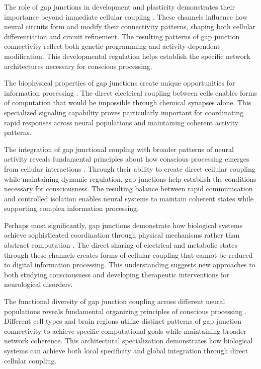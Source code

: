 \begin{refsection}
The role of gap junctions in development and plasticity demonstrates their importance beyond immediate cellular coupling \cite{Nadarajah1996}. These channels influence how neural circuits form and modify their connectivity patterns, shaping both cellular differentiation and circuit refinement. The resulting patterns of gap junction connectivity reflect both genetic programming and activity-dependent modification. This developmental regulation helps establish the specific network architectures necessary for conscious processing.

The biophysical properties of gap junctions create unique opportunities for information processing \cite{Palacios-Prado2009}. The direct electrical coupling between cells enables forms of computation that would be impossible through chemical synapses alone. This specialized signaling capability proves particularly important for coordinating rapid responses across neural populations and maintaining coherent activity patterns.

The integration of gap junctional coupling with broader patterns of neural activity reveals fundamental principles about how conscious processing emerges from cellular interactions \cite{Nielsen2012}. Through their ability to create direct cellular coupling while maintaining dynamic regulation, gap junctions help establish the conditions necessary for consciousness. The resulting balance between rapid communication and controlled isolation enables neural systems to maintain coherent states while supporting complex information processing.

Perhaps most significantly, gap junctions demonstrate how biological systems achieve sophisticated coordination through physical mechanisms rather than abstract computation \cite{Bennett2004}. The direct sharing of electrical and metabolic states through these channels creates forms of cellular coupling that cannot be reduced to digital information processing. This understanding suggests new approaches to both studying consciousness and developing therapeutic interventions for neurological disorders.

The functional diversity of gap junction coupling across different neural populations reveals fundamental organizing principles of conscious processing \cite{Connors2004}. Different cell types and brain regions utilize distinct patterns of gap junction connectivity to achieve specific computational goals while maintaining broader network coherence. This architectural specialization demonstrates how biological systems can achieve both local specificity and global integration through direct cellular coupling.


\end{refsection}

